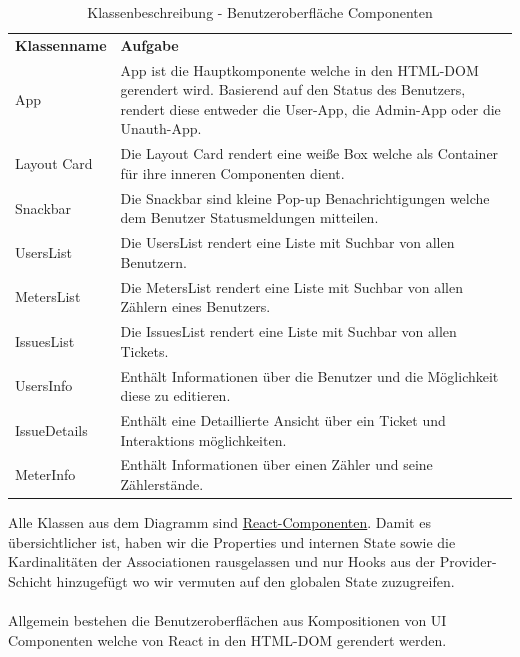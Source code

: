 \begin{table}[H]
	\centering
	\begin{tabularx}{\textwidth}{X X}
		\rowcolor[HTML]{C0C0C0} 
		\textbf{Klassenname} & \textbf{Aufgabe} \\
		App & App ist die Hauptkomponente welche in den HTML-DOM gerendert wird. Basierend auf den Status des Benutzers, rendert diese entweder die 	User-App, die Admin-App oder die Unauth-App. \\
		\rowcolor[HTML]{E7E7E7} 
		Layout Card & Die Layout Card rendert eine weiße Box welche als Container für ihre inneren Componenten dient.  \\
		Snackbar & Die Snackbar sind kleine Pop-up Benachrichtigungen welche dem Benutzer Statusmeldungen mitteilen.  \\
		\rowcolor[HTML]{E7E7E7} 
		UsersList & Die UsersList rendert eine Liste mit Suchbar von allen Benutzern. \\
		MetersList & Die MetersList rendert eine Liste mit Suchbar von allen Zählern eines Benutzers. \\
		\rowcolor[HTML]{E7E7E7} 
		IssuesList & Die IssuesList rendert eine Liste mit Suchbar von allen Tickets.\\
		UsersInfo & Enthält Informationen über die Benutzer und die Möglichkeit diese zu editieren. \\
		\rowcolor[HTML]{E7E7E7} 
		IssueDetails & Enthält eine Detaillierte Ansicht über ein Ticket und Interaktions möglichkeiten.\\
		MeterInfo & Enthält Informationen über einen Zähler und seine Zählerstände.
	\end{tabularx}
	\caption{Klassenbeschreibung - Benutzeroberfläche Componenten}
	\label{table:klassenbeschreibung-ui}
\end{table}

Alle Klassen aus dem Diagramm sind \href{https://reactjs.org/docs/components-and-props.html}{React-Componenten}. Damit es übersichtlicher ist, haben wir die Properties und internen State sowie die Kardinalitäten der Associationen rausgelassen und nur Hooks aus der Provider-Schicht hinzugefügt wo wir vermuten auf den globalen State zuzugreifen. \\ \\
Allgemein bestehen die Benutzeroberflächen aus Kompositionen von UI Componenten welche von React in den HTML-DOM gerendert werden. 
 
